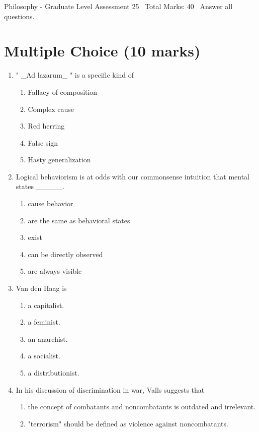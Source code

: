\documentclass[12pt]{article}
\begin{document}
\begin{center}
Philosophy - Graduate Level Assessment 25 \
Total Marks: 40 \
Answer all questions.
\end{center}

\section*{Multiple Choice (10 marks)}
\begin{enumerate}[label=\arabic*.]
\item " \_Ad lazarum\_ " is a specific kind of
\begin{enumerate}[label=(\alph*)]
    \item Fallacy of composition
    \item Complex cause
    \item Red herring
    \item False sign
    \item Hasty generalization
\end{enumerate}
\item Logical behaviorism is at odds with our commonsense intuition that mental states \_\_\_\_\_.
\begin{enumerate}[label=(\alph*)]
    \item cause behavior
    \item are the same as behavioral states
    \item exist
    \item can be directly observed
    \item are always visible
\end{enumerate}
\item Van den Haag is
\begin{enumerate}[label=(\alph*)]
    \item a capitalist.
    \item a feminist.
    \item an anarchist.
    \item a socialist.
    \item a distributionist.
\end{enumerate}
\item In his discussion of discrimination in war, Valls suggests that
\begin{enumerate}[label=(\alph*)]
    \item the concept of combatants and noncombatants is outdated and irrelevant.
    \item "terrorism" should be defined as violence against noncombatants.

\end{enumerate}
\end{enumerate}
\end{document}
